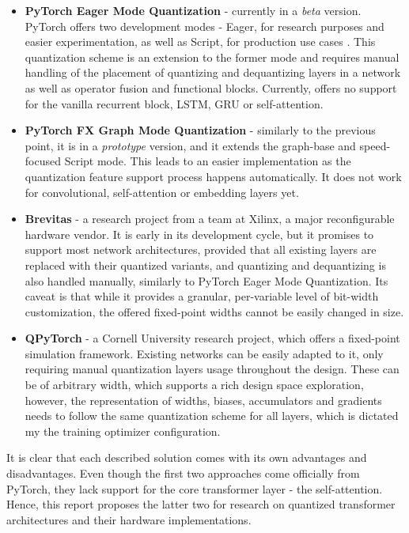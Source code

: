 \begin{itemize}
  \item \textbf{PyTorch Eager Mode Quantization} \cite{77-krishnamoorthistatic} - currently in a \textit{beta} version. PyTorch offers two development modes - Eager, for research purposes and easier experimentation, as well as Script, for production use cases \cite{79-sharmapytorch}. This quantization scheme is an extension to the former mode and requires manual handling of the placement of quantizing and dequantizing layers in a network as well as operator fusion and functional blocks. Currently, offers no support for the vanilla recurrent block, LSTM, GRU or self-attention.

  \item \textbf{PyTorch FX Graph Mode Quantization} \cite{78-zhangfx} - similarly to the previous point, it is in a \textit{prototype} version, and it extends the graph-base and speed-focused Script mode. This leads to an easier implementation as the quantization feature support process happens automatically. It does not work for convolutional, self-attention or embedding layers yet.

  \item \textbf{Brevitas} \cite{brevitas} - a research project from a team at Xilinx, a major reconfigurable hardware vendor. It is early in its development cycle, but it promises to support most network architectures, provided that all existing layers are replaced with their quantized variants, and quantizing and dequantizing is also handled manually, similarly to PyTorch Eager Mode Quantization. Its caveat is that while it provides a granular, per-variable level of bit-width customization, the offered fixed-point widths cannot be easily changed in size.

  \item \textbf{QPyTorch} \cite{zhang2019qpytorch} - a Cornell University research project, which offers a fixed-point simulation framework. Existing networks can be easily adapted to it, only requiring manual quantization layers usage throughout the design. These can be of arbitrary width, which supports a rich design space exploration, however, the representation of widths, biases, accumulators and gradients needs to follow the same quantization scheme for all layers, which is dictated my the training optimizer configuration.
\end{itemize}

It is clear that each described solution comes with its own advantages and disadvantages. Even though the first two approaches come officially from PyTorch, they lack support for the core transformer layer - the self-attention. Hence, this report proposes the latter two for research on quantized transformer architectures and their hardware implementations.

